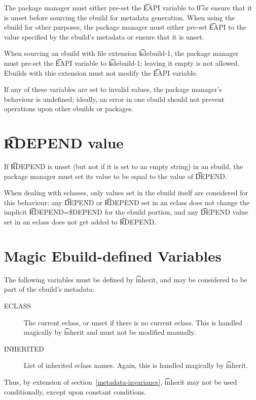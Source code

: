 The package manager must either pre-set the \t{EAPI} variable to \t{0} or ensure that it is unset
before sourcing the ebuild for metadata generation. When using the ebuild for other purposes, the
package manager must either pre-set \t{EAPI} to the value specified by the ebuild's metadata or
ensure that it is unset.

\IFKDEBUILDELSE
{
    When sourcing an ebuild with file extension \t{kdebuild-1}, the package manager must pre-set the
    \t{EAPI} variable to \t{kdebuild-1}; leaving it empty is not allowed. Ebuilds with this
    extension must not modify the \t{EAPI} variable.
}{
}

If any of these variables are set to invalid values, the package manager's behaviour is undefined;
ideally, an error in one ebuild should not prevent operations upon other ebuilds or packages.

\section{\t{RDEPEND} value}
\label{rdepend-depend}

If \t{RDEPEND} is unset (but not if it is set to an empty string) in an ebuild, the package manager
must set its value to be equal to the value of \t{DEPEND}.

When dealing with eclasses, only values set in the ebuild itself are considered for this behaviour;
any \t{DEPEND} or \t{RDEPEND} set in an eclass does not change the implicit \t{RDEPEND=\$DEPEND} for
the ebuild portion, and any \t{DEPEND} value set in an eclass does not get added to \t{RDEPEND}.

\section{Magic Ebuild-defined Variables}

The following variables must be defined by \t{inherit}, and may be considered to be part
of the ebuild's metadata:

\begin{description}
\item[ECLASS] The current eclass, or unset if there is no current eclass. This is handled magically
	by \t{inherit} and must not be modified manually.
\item[INHERITED] List of inherited eclass names. Again, this is handled magically by \t{inherit}.
\end{description}

\note Thus, by extension of section~\ref{metadata-invariance}, \t{inherit} may not be used
    conditionally, except upon constant conditions.


